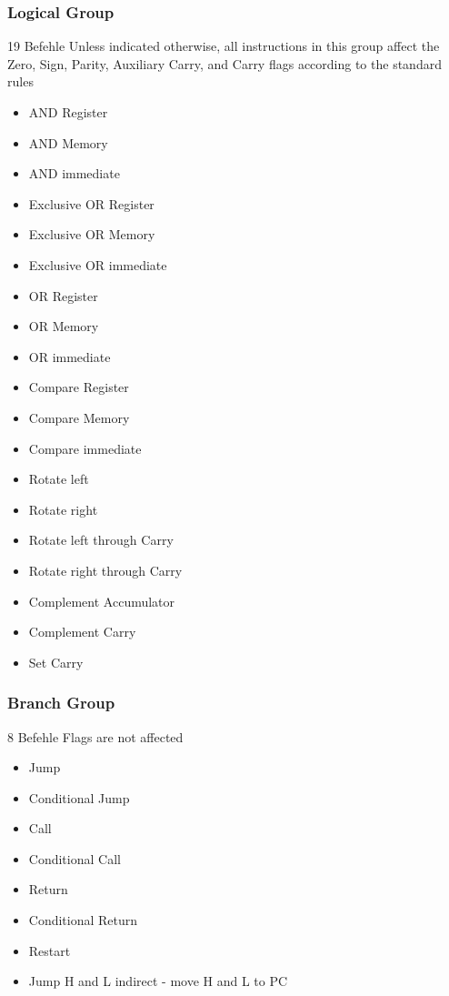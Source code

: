 \documentclass[12pt]{article}
\begin{document}
\subsubsection{Logical Group}
19 Befehle
Unless indicated otherwise, all instructions in this
group affect the Zero, Sign, Parity, Auxiliary Carry, and
Carry flags according to the standard rules

\begin{multicols}{2}
\begin{itemize}
\item AND Register
\item AND Memory
\item AND immediate
\item Exclusive OR Register
\item Exclusive OR Memory
\item Exclusive OR immediate
\item OR Register
\item OR Memory
\item OR immediate
\item Compare Register
\item Compare Memory
\item Compare immediate
\item Rotate left
\item Rotate right
\item Rotate left through Carry
\item Rotate right through Carry
\item Complement Accumulator
\item Complement Carry
\item Set Carry
\end{itemize}
\end{multicols}


\subsubsection{Branch Group}
8 Befehle
Flags are not affected

\begin{itemize}
\item Jump
\item Conditional Jump
\item Call
\item Conditional Call
\item Return
\item Conditional Return
\item Restart
\item Jump H and L indirect - move H and L to PC
\end{itemize}
\end{document}
